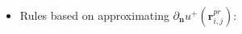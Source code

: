 \documentclass{elsarticle}
\begin{document}
\begin{itemize}
\item Rules based on approximating $\partial_\mathbf{n}u^+(\mathbf{r}^{pr}_{i,j})$:
\end{itemize}
\end{document}
